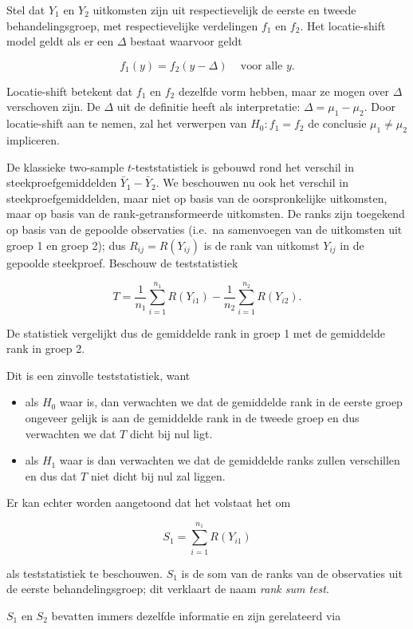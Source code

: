 \documentclass[
  12pt,dutch,coursenotes]{book}
\begin{document}
Stel dat \(Y_1\) en \(Y_2\) uitkomsten zijn uit respectievelijk de eerste en tweede behandelingsgroep, met respectievelijke verdelingen \(f_1\) en \(f_2\). Het locatie-shift model geldt als er een \(\Delta\) bestaat waarvoor geldt

\[
   f_1(y)=f_2(y-\Delta) \;\;\;\text{ voor alle } y.
 \]

Locatie-shift betekent dat \(f_1\) en \(f_2\) dezelfde vorm hebben, maar ze mogen over \(\Delta\) verschoven zijn.
De \(\Delta\) uit de definitie heeft als interpretatie: \(\Delta = \mu_1-\mu_2\).
Door locatie-shift aan te nemen, zal het verwerpen van \(H_0: f_1=f_2\) de conclusie \(\mu_1\neq \mu_2\) impliceren.

De klassieke two-sample \(t\)-teststatistiek is gebouwd rond het verschil in steekproefgemiddelden \(\bar{Y}_1-\bar{Y}_2\). We beschouwen nu ook het verschil in steekproefgemiddelden, maar niet op basis van de oorspronkelijke uitkomsten, maar op basis van de rank-getransformeerde uitkomsten. De ranks zijn toegekend op basis van de gepoolde observaties (i.e.~na samenvoegen van de uitkomsten uit groep 1 en groep 2); dus \(R_{ij}=R(Y_{ij})\) is de rank van uitkomst \(Y_{ij}\) in de gepoolde steekproef.
Beschouw de teststatistiek

\[
  T = \frac{1}{n_1}\sum_{i=1}^{n_1} R(Y_{i1}) - \frac{1}{n_2}\sum_{i=1}^{n_2} R(Y_{i2}) .
\]

De statistiek vergelijkt dus de gemiddelde rank in groep 1 met de gemiddelde rank in groep 2.

Dit is een zinvolle teststatistiek, want

\begin{itemize}
\item
  als \(H_0\) waar is, dan verwachten we dat de gemiddelde rank in de eerste groep ongeveer gelijk is aan de gemiddelde rank in de tweede groep en dus verwachten we dat \(T\) dicht bij nul ligt.
\item
  als \(H_1\) waar is dan verwachten we dat de gemiddelde ranks zullen verschillen en dus dat \(T\) niet dicht bij nul zal liggen.
\end{itemize}

Er kan echter worden aangetoond dat het volstaat het om

\[S_1=\sum_{i=1}^{n_1} R(Y_{i1})\]

als teststatistiek te beschouwen. \(S_1\) is de som van de ranks van de observaties uit de eerste behandelingsgroep; dit verklaart de naam \emph{rank sum test}.

\(S_1\) en \(S_2\) bevatten immers dezelfde informatie en zijn gerelateerd via
\end{document}
